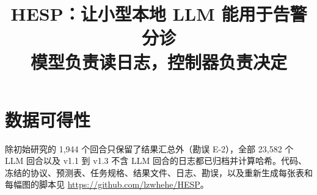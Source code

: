 \documentclass[conference,compsoc,a4paper]{IEEEtran}
\newcommand{\hesp}{HESP}
\newcommand{\repourl}{\url{https://github.com/lzwhehe/HESP}}
\begin{document}
\title{\hesp{}：让小型本地 LLM 能用于告警分诊\\模型负责读日志，控制器负责决定}

\author{
\and
{}
}

\maketitle













\section*{数据可得性}
除初始研究的 1{,}944 个回合只保留了结果汇总外（勘误 E-2），全部 23{,}582 个 LLM 回合以及 v1.1 到 v1.3 不含 LLM 回合的日志都已归档并计算哈希。代码、冻结的协议、预测表、任务规格、结果文件、日志、勘误，以及重新生成每张表和每幅图的脚本见 \repourl{}。

{\footnotesize

}

\appendices

\end{document}
